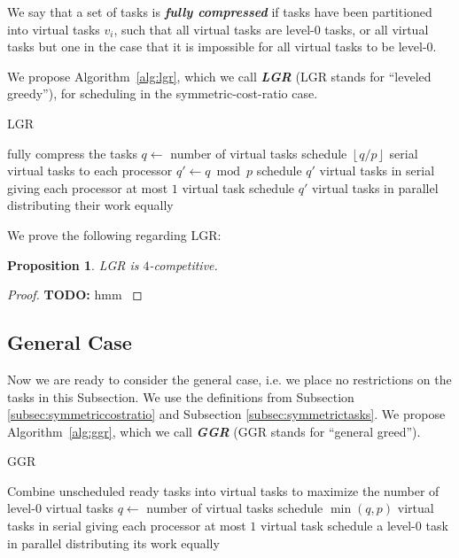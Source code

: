 \documentclass[twocolumn]{article}[10pt]
\newcommand{\defn}[1]{{\textit{\textbf{\boldmath #1}}}\xspace}
\newcommand{\todo}[1]{{\color{red}\textbf{TODO:} #1}}
\newcommand{\floor}[1]{\left\lfloor #1 \right\rfloor}
\newtheorem{proposition}{Proposition}
\begin{document}
We say that a set of tasks is \defn{fully compressed} if tasks have been
partitioned into virtual tasks $v_i$, such that all virtual
tasks are level-$0$ tasks, or all virtual tasks but one in the
case that it is impossible for all virtual tasks to be level-$0$.

We propose Algorithm~\ref{alg:lgr}, which we call \defn{LGR}
(LGR stands for \enquote{leveled greedy}),
for scheduling in the symmetric-cost-ratio case.

\begin{algorithm}
  \caption{LGR}
  \label{alg:lgr}
  \begin{algorithmic}
        \State fully compress the tasks 
        \State $q \gets $ number of virtual tasks 
        \State schedule $\floor{q/p}$ serial virtual tasks to each processor
        \State $q' \gets q \bmod p$ 
          \State schedule $q'$ virtual tasks in serial
          \State giving each processor at most $1$ virtual task
        \Else
          \State schedule $q'$ virtual tasks in parallel
          \State distributing their work equally
        \EndIf
      \EndIf
    \EndWhile
  \end{algorithmic}
\end{algorithm}

We prove the following regarding LGR:

\begin{proposition}
  LGR is $4$-competitive.
\end{proposition}
\begin{proof}
  \todo{
  hmm
}
\end{proof}

\subsection{General Case}
Now we are ready to consider the general case, i.e. we place no
restrictions on the tasks in this Subsection.
We use the definitions from Subsection
\ref{subsec:symmetriccostratio} and Subsection
\ref{subsec:symmetrictasks}.
We propose Algorithm~\ref{alg:ggr}, which we call
\defn{GGR} (GGR stands for \enquote{general greed}).

\begin{algorithm}
  \caption{GGR}
  \label{alg:ggr}
  \begin{algorithmic}
        \State Combine unscheduled ready tasks into virtual tasks
        to maximize the number of level-$0$ virtual tasks
        \State $q \gets $ number of virtual tasks 
          \State schedule $\min(q, p)$ virtual tasks in serial
          \State giving each processor at most $1$ virtual task
        \Else
          \State schedule a level-$0$ task in parallel
          \State distributing its work equally 
        \EndIf
      \EndIf
    \EndWhile
  \end{algorithmic}
\end{algorithm}
\end{document}
